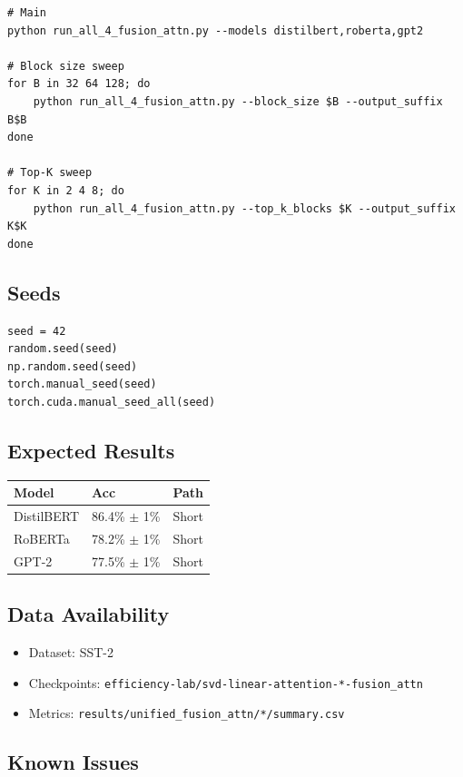 \begin{lstlisting}
# Main
python run_all_4_fusion_attn.py --models distilbert,roberta,gpt2

# Block size sweep
for B in 32 64 128; do
    python run_all_4_fusion_attn.py --block_size $B --output_suffix B$B
done

# Top-K sweep
for K in 2 4 8; do
    python run_all_4_fusion_attn.py --top_k_blocks $K --output_suffix K$K
done
\end{lstlisting}

\subsection{Seeds}

\begin{lstlisting}
seed = 42
random.seed(seed)
np.random.seed(seed)
torch.manual_seed(seed)
torch.cuda.manual_seed_all(seed)
\end{lstlisting}

\subsection{Expected Results}

\begin{table}[H]
\centering
\small
\begin{tabular}{lll}
\toprule
\textbf{Model} & \textbf{Acc} & \textbf{Path} \\
\midrule
DistilBERT & 86.4\% $\pm$ 1\% & Short \\
RoBERTa & 78.2\% $\pm$ 1\% & Short \\
GPT-2 & 77.5\% $\pm$ 1\% & Short \\
\bottomrule
\end{tabular}
\end{table}

\subsection{Data Availability}

\begin{itemize}
\item Dataset: SST-2
\item Checkpoints: \texttt{efficiency-lab/svd-linear-attention-*-fusion\_attn}
\item Metrics: \texttt{results/unified\_fusion\_attn/*/summary.csv}

\end{itemize}
\subsection{Known Issues}


